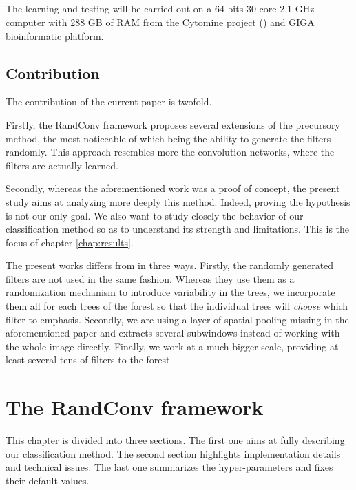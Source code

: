 \documentclass[a4paper]{report}
\begin{document}
	\paragraph{}
	The learning and testing will be carried out on a 64-bits 30-core 2.1 GHz computer with 288 GB of RAM from the Cytomine project (\cite{cytomine}) and GIGA bioinformatic platform.
	
	
	\section{Contribution}
	The contribution of the current paper is twofold.
	\par
	Firstly, the RandConv framework proposes several extensions of the precursory method, the most noticeable of which being the ability to generate the filters randomly. This approach resembles more the convolution networks, where the filters are actually learned.
	\par
	Secondly, whereas the aforementioned work was a proof of concept, the present study aims at analyzing more deeply this method. Indeed, proving the hypothesis is not our only goal. We also want to study closely the behavior of our classification method so as to understand its strength and limitations. This is the focus of chapter \ref{chap:results}.
	\par
	The present works differs from \cite{NearlySame} in three ways. Firstly, the randomly generated filters are not used in the same fashion. Whereas they use them as a randomization mechanism to introduce variability in the trees, we incorporate them all for each trees of the forest so that the individual trees will \textit{choose} which filter to emphasis. Secondly, we are using a layer of spatial pooling missing in the aforementioned paper and extracts several subwindows instead of working with the whole image directly. Finally, we work at a much bigger scale, providing at least several tens of filters to the forest. 

\chapter{\label{chap:RandConv}The RandConv framework}
This chapter is divided into three sections. The first one aims at fully describing our classification method. The second section highlights implementation details and technical issues. The last one summarizes the hyper-parameters and fixes their default values.
\end{document}
